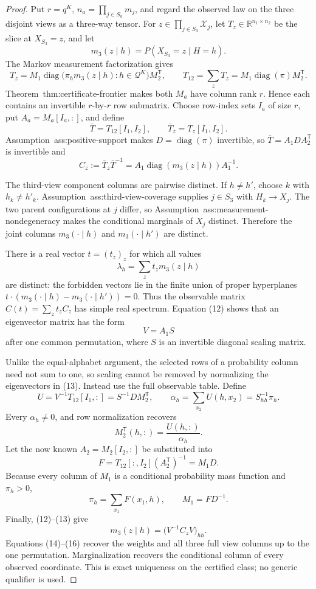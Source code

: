 \documentclass{article}
\begin{document}
\begin{proof}
Put \(r=q^K\), \(n_a=\prod_{j\in S_a}m_j\), and regard the observed law on the three disjoint views as a three-way tensor.  For \(z\in\prod_{j\in S_3}\mathcal X_j\), let \(T_z\in\mathbb R^{n_1\times n_2}\) be the slice at \(X_{S_3}=z\), and let
\[
 m_3(z\mid h)=P(X_{S_3}=z\mid H=h).
\]
The Markov measurement factorization gives
\[
 T_z=M_1\operatorname{diag}
 \bigl(\pi_hm_3(z\mid h):h\in\mathcal Q^K\bigr)M_2^{\mathsf T},
 \qquad
 T_{12}=\sum_zT_z=M_1\operatorname{diag}(\pi)M_2^{\mathsf T}.
\tag{11}
\]
Theorem~\textnormal{thm:certificate-frontier} makes both \(M_a\) have column rank \(r\).  Hence each contains an invertible \(r\)-by-\(r\) row submatrix.  Choose row-index sets \(I_a\) of size \(r\), put \(A_a=M_a[I_a,:]\), and define
\[
 \overline T=T_{12}[I_1,I_2],
 \qquad
 \overline T_z=T_z[I_1,I_2].
\]
Assumption~\textnormal{ass:positive-support} makes \(D=\operatorname{diag}(\pi)\) invertible, so \(\overline T=A_1DA_2^{\mathsf T}\) is invertible and
\[
 C_z:=\overline T_z\overline T^{-1}
 =A_1\operatorname{diag}(m_3(z\mid h))A_1^{-1}.
\tag{12}
\]

The third-view component columns are pairwise distinct.  If \(h\neq h'\), choose \(k\) with \(h_k\neq h'_k\).  Assumption~\textnormal{ass:third-view-coverage} supplies \(j\in S_3\) with \(H_k\to X_j\).  The two parent configurations at \(j\) differ, so Assumption~\textnormal{ass:measurement-nondegeneracy} makes the conditional marginals of \(X_j\) distinct.  Therefore the joint columns \(m_3(\cdot\mid h)\) and \(m_3(\cdot\mid h')\) are distinct.

There is a real vector \(t=(t_z)_z\) for which all values
\[
 \lambda_h=\sum_zt_zm_3(z\mid h)
\]
are distinct: the forbidden vectors lie in the finite union of proper hyperplanes \(t\cdot(m_3(\cdot\mid h)-m_3(\cdot\mid h'))=0\).  Thus the observable matrix \(C(t)=\sum_zt_zC_z\) has simple real spectrum.  Equation (12) shows that an eigenvector matrix has the form
\[
 V=A_1S
\tag{13}
\]
after one common permutation, where \(S\) is an invertible diagonal scaling matrix.

Unlike the equal-alphabet argument, the selected rows of a probability column need not sum to one, so scaling cannot be removed by normalizing the eigenvectors in (13).  Instead use the full observable table.  Define
\[
 U=V^{-1}T_{12}[I_1,:]
 =S^{-1}D M_2^{\mathsf T},
 \qquad
 \alpha_h=\sum_{x_2}U(h,x_2)=S_{hh}^{-1}\pi_h.
\]
Every \(\alpha_h\neq0\), and row normalization recovers
\[
 M_2^{\mathsf T}(h,:)=\frac{U(h,:)}{\alpha_h}.
\tag{14}
\]
Let the now known \(A_2=M_2[I_2,:]\) be substituted into
\[
 F=T_{12}[:,I_2](A_2^{\mathsf T})^{-1}=M_1D.
\]
Because every column of \(M_1\) is a conditional probability mass function and \(\pi_h>0\),
\[
 \pi_h=\sum_{x_1}F(x_1,h),
 \qquad
 M_1=F D^{-1}.
\tag{15}
\]
Finally, (12)--(13) give
\[
 m_3(z\mid h)=\bigl(V^{-1}C_zV\bigr)_{hh}.
\tag{16}
\]
Equations (14)--(16) recover the weights and all three full view columns up to the one permutation.  Marginalization recovers the conditional column of every observed coordinate.  This is exact uniqueness on the certified class; no generic qualifier is used.


\end{proof}
\end{document}
